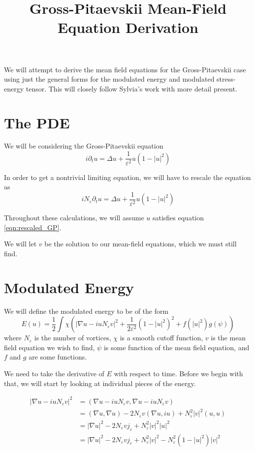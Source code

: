 \documentclass[a4paper]{article}
\title{Gross-Pitaevskii Mean-Field Equation Derivation}
\date{}
\author{}
\begin{document}
\maketitle
We will attempt to derive the mean field equations for the Gross-Pitaevskii case using just the general forms for the modulated energy and modulated
stress-energy tensor. This will closely follow Sylvia's work with more detail present.

\section{The PDE}
We will be considering the Gross-Pitaevskii equation
\begin{equation} \label{eqn:GP}
  i \partial_t u = \Delta u + \frac{1}{\varepsilon^2} u (1-|u|^2)
\end{equation}

In order to get a nontrivial limiting equation, we will have to rescale the equation as
\begin{equation}
  i N_\varepsilon \partial_t u = \Delta u + \frac{1}{\varepsilon^2} u (1-|u|^2)
  \label{eqn:rescaled_GP}
\end{equation}

Throughout these calculations, we will assume $u$ satisfies equation \eqref{eqn:rescaled_GP}.

We will let $v$ be the solution to our mean-field equations, which we must still find.

\section{Modulated Energy}
We will define the modulated energy to be of the form
\begin{equation} \label{eqn:mod_energy_form}
  E(u) = \frac{1}{2} \int \chi \left( |\nabla u - i uN_\varepsilon v|^2 + \frac{1}{2\varepsilon^2} (1-|u|^2)^2 + f(|u|^2) g(\psi) \right)
\end{equation}
where $N_\varepsilon$ is the number of vortices, $\chi$ is a smooth cutoff function, $v$ is the mean field equation we wish to find, $\psi$ is some
function of the mean field equation, and $f$ and $g$ are some functions.

We need to take the derivative of $E$ with respect to time. Before we begin with that, we will start by looking at individual pieces of the energy.

\begin{align}
  | \nabla u - i u N_\varepsilon v|^2 &= (\nabla u - i u N_\varepsilon v, \nabla u - i u N_\varepsilon v) \nonumber \\
  &= (\nabla u, \nabla u) - 2N_\varepsilon v ( \nabla u, iu ) + N_\varepsilon^2 |v|^2 (u,u) \nonumber \\
  &= |\nabla u|^2 - 2 N_\varepsilon v j_\varepsilon + N_\varepsilon^2 |v|^2 |u|^2 \nonumber \\
  &= |\nabla u|^2 - 2N_\varepsilon v j_\varepsilon + N_\varepsilon^2 |v|^2 - N_\varepsilon^2 (1 - |u|^2)|v|^2
  \label{eqn:mod_grad}
\end{align}
\end{document}

